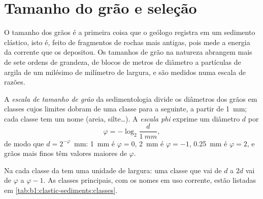 \section{Tamanho do grão e seleção}\label{sec:b1:clastic-sediments:grain-size}

O tamanho dos grãos é a primeira coisa que o geólogo registra em um sedimento clástico, isto é, feito de fragmentos de rochas mais antigas, pois mede a energia da corrente que os depositou. Os tamanhos de grão na natureza abrangem mais de sete ordens de grandeza, de blocos de metros de diâmetro a partículas de argila de um milésimo de milímetro de largura, e são medidos numa escala de razões.

\begin{definition}\label{def:b1:clastic-sediments:grain-size}
A \emph{escala de tamanho de grão} da sedimentologia divide os diâmetros dos grãos em classes cujos limites dobram de uma classe para a seguinte, a partir de \qty{1}{mm}; cada classe tem um nome (areia, silte\ldots). A \emph{escala phi} exprime um diâmetro $d$ por
\[
  \varphi = -\log_2 \frac{d}{\qty{1}{mm}},
\]
de modo que $d = 2^{-\varphi}$~mm: \qty{1}{mm} é $\varphi = 0$, \qty{2}{mm} é $\varphi = -1$, \qty{0.25}{mm} é $\varphi = 2$, e grãos mais finos têm valores maiores de $\varphi$.
\end{definition}

Na  cada classe da  tem uma unidade de largura: uma classe que vai de $d$ a $2d$ vai de $\varphi$ a $\varphi - 1$. As classes principais, com os nomes em uso corrente, estão listadas em \cref{tab:b1:clastic-sediments:classes}.

